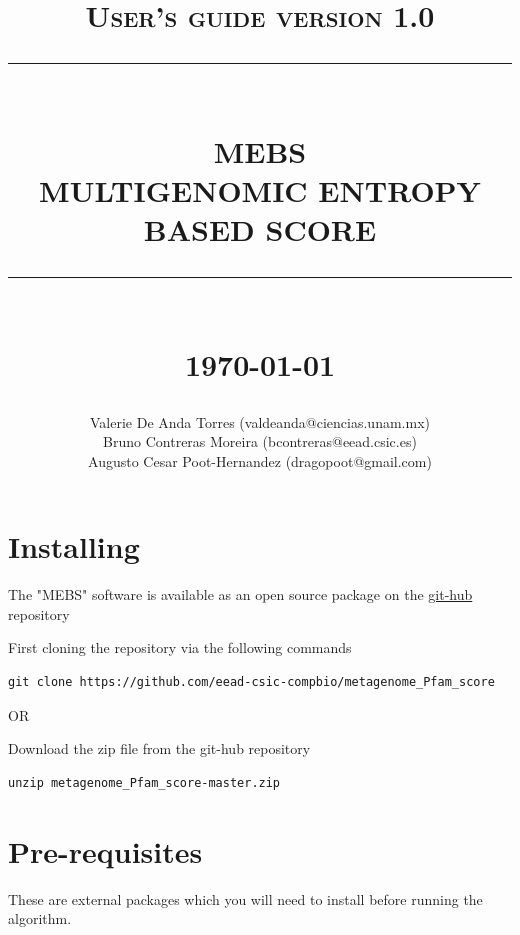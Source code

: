 \documentclass[12pt]{report}
\newcommand{\HRule}[1]{\rule{\linewidth}{#1}}
\begin{document}
\title{ \normalsize \textsc{User's guide version 1.0}
		\\ [2.0cm]
		\HRule{0.5pt} \\
		\LARGE \textbf{\uppercase{MEBS}}\\
  \textbf{\uppercase{Multigenomic Entropy based Score}}      
		\HRule{2pt} \\ [0.5cm]
		\normalsize \today \vspace*{5\baselineskip}}

\date{}

\author{
		Valerie De Anda Torres (valdeanda@ciencias.unam.mx) \\ 
		Bruno Contreras Moreira (bcontreras@eead.csic.es) \\
		Augusto Cesar Poot-Hernandez (dragopoot@gmail.com) }

\maketitle
\tableofcontents
\newpage

\sectionfont{\scshape}
\section{Installing}
The "MEBS" software is available as an open source package on the
\href{https://github.com/eead-csic-compbio/metagenome_Pfam_score}{git-hub}
repository

First cloning the repository via the following commands

\begin{verbatim}
git clone https://github.com/eead-csic-compbio/metagenome_Pfam_score
\end{verbatim}
       
       OR 

Download the zip file from the git-hub repository 

\begin{verbatim}
unzip metagenome_Pfam_score-master.zip
\end{verbatim}

\section{Pre-requisites}
These are external packages which you will need to install before running the
algorithm. 
\end{document}
